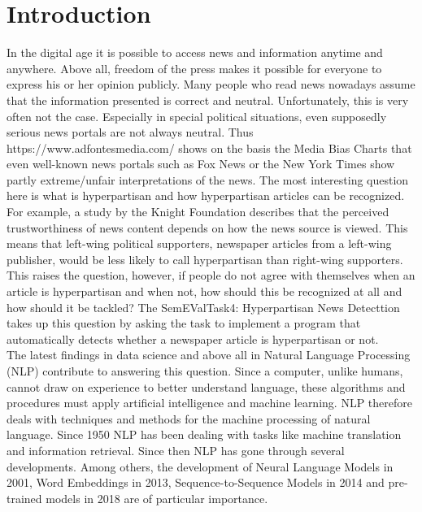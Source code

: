 \documentclass[a4paper, 11pt,titlepage,oneside,openany]{book}
\begin{document}

\chapter{Introduction}
In the digital age it is possible to access news and information anytime and anywhere. Above all, freedom of the press makes it possible for everyone to express his or her opinion publicly. Many people who read news nowadays assume that the information presented is correct and neutral. Unfortunately, this is very often not the case. Especially in special political situations, even supposedly serious news portals are not always neutral.  Thus https://www.adfontesmedia.com/ shows on the basis the Media Bias Charts that even well-known news portals such as Fox News or the New York Times show partly extreme/unfair interpretations of the news. The most interesting question here is what is hyperpartisan and how hyperpartisan articles can be recognized. For example, a study by the Knight Foundation \cite{study} describes that the perceived trustworthiness of news content depends on how the news source is viewed.  This means that left-wing political supporters, newspaper articles from a left-wing publisher, would be less likely to call hyperpartisan than right-wing supporters. This raises the question, however, if people do not agree with themselves when an article is hyperpartisan and when not, how should this be recognized at all and how should it be tackled? The SemEValTask4: Hyperpartisan News Detecttion takes up this question by asking the task to implement a program that automatically detects whether a newspaper article is hyperpartisan or not. \\
\indent The latest findings in data science and above all in Natural Language Processing (NLP) contribute to answering this question. Since a computer, unlike humans, cannot draw on experience to better understand language, these algorithms and procedures must apply artificial intelligence and machine learning. NLP therefore deals with techniques and methods for the machine processing of natural language. Since 1950 NLP has been dealing with tasks like machine translation and information retrieval. Since then NLP has gone through several developments. Among others, the development of Neural Language Models in 2001, Word Embeddings in 2013, Sequence-to-Sequence Models in 2014 and pre-trained models in 2018 are of particular importance. \\
\end{document}
